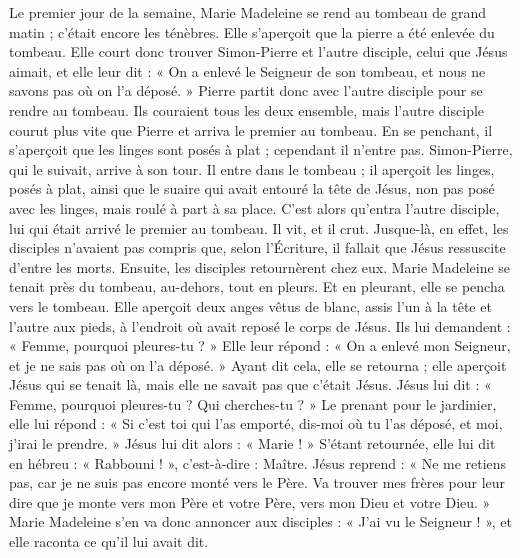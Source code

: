 \documentclass[RG2023_CarnetSpecial.tex]{subfiles}
\begin{document}
Le premier jour de la semaine, Marie Madeleine se rend au tombeau de grand matin ;
	c’était encore les ténèbres.
Elle s’aperçoit que la pierre a été enlevée du tombeau.
Elle court donc trouver Simon-Pierre et l’autre disciple, celui que Jésus aimait,
	et elle leur dit : « On a enlevé le Seigneur de son tombeau,
	et nous ne savons pas où on l’a déposé. »
Pierre partit donc avec l’autre disciple pour se rendre au tombeau.
Ils couraient tous les deux ensemble,
	mais l’autre disciple courut plus vite que Pierre et arriva le premier au tombeau.
En se penchant, il s’aperçoit que les linges sont posés à plat ; cependant il n’entre pas.
	Simon-Pierre, qui le suivait, arrive à son tour.
Il entre dans le tombeau ; il aperçoit les linges, posés à plat,
	ainsi que le suaire qui avait entouré la tête de Jésus,
	non pas posé avec les linges, mais roulé à part à sa place.
C’est alors qu’entra l’autre disciple, lui qui était arrivé le premier au tombeau.
Il vit, et il crut.
Jusque-là, en effet, les disciples n’avaient pas compris 
	que, selon l’Écriture, il fallait que Jésus ressuscite d’entre les morts.
Ensuite, les disciples retournèrent chez eux.
Marie Madeleine se tenait près du tombeau, au-dehors, tout en pleurs.
Et en pleurant, elle se pencha vers le tombeau.
Elle aperçoit deux anges vêtus de blanc, assis l’un à la tête et l’autre aux pieds,
	à l’endroit où avait reposé le corps de Jésus.
Ils lui demandent : « Femme, pourquoi pleures-tu ? »
Elle leur répond : « On a enlevé mon Seigneur, et je ne sais pas où on l’a déposé. »
Ayant dit cela, elle se retourna ;
	elle aperçoit Jésus qui se tenait là, mais elle ne savait pas que c’était Jésus.
Jésus lui dit : « Femme, pourquoi pleures-tu ? Qui cherches-tu ? »
Le prenant pour le jardinier, elle lui répond :
	« Si c’est toi qui l’as emporté, dis-moi où tu l’as déposé, et moi, j’irai le prendre. »
Jésus lui dit alors : « Marie ! »
	S’étant retournée, elle lui dit en hébreu : « Rabbouni ! », c’est-à-dire : Maître.
Jésus reprend : « Ne me retiens pas, car je ne suis pas encore monté vers le Père.
Va trouver mes frères
	pour leur dire que je monte vers mon Père et votre Père, vers mon Dieu et votre Dieu. »
Marie Madeleine s’en va donc annoncer aux disciples : « J’ai vu le Seigneur ! »,
	et elle raconta ce qu’il lui avait dit.
	
\end{document}

